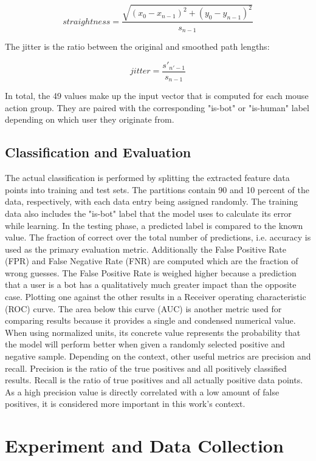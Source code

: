 \documentclass[
    fontsize=12pt,
    headings=small,
    parskip=half,           %
    bibliography=totoc,
    numbers=noenddot,       %
    open=any,               %
    final,                   %
    table
]{scrreprt}
\begin{document}
\[
straightness = \frac{ \sqrt{ (x_0 - x_{n-1})^2 + (y_0 - y_{n-1})^2 } }{s_{n-1}}
\]

The jitter is the ratio between the original and smoothed path lengths:

\[
jitter = \frac{s'_{n'-1}}{s_{n-1}}
\]

In total, the 49 values make up the input vector that is computed for each mouse action group. They are paired with the corresponding "is-bot" or "is-human" label depending on which user they originate from.


\subsection{Classification and Evaluation}

The actual classification is performed by splitting the extracted feature data points into training and test sets. The partitions contain 90 and 10 percent of the data, respectively, with each data entry being assigned randomly. The training data also includes the "is-bot" label that the model uses to calculate its error while learning. In the testing phase, a predicted label is compared to the known value. The fraction of correct over the total number of predictions, i.e. accuracy is used as the primary evaluation metric. Additionally the False Positive Rate (FPR) and False Negative Rate (FNR) are computed which are the fraction of wrong guesses. The False Positive Rate is weighed higher because a prediction that a user is a bot has a qualitatively much greater impact than the opposite case. Plotting one against the other results in a Receiver operating characteristic (ROC) curve. The area below this curve (AUC) is another metric used for comparing results because it provides a single and condensed numerical value. When using normalized units, its concrete value represents the probability that the model will perform better when given a randomly selected positive and negative sample.\cite{FAWCETT2006861} Depending on the context, other useful metrics are precision and recall. Precision is the ratio of the true positives and all positively classified results. Recall is the ratio of true positives and all actually positive data points. As a high precision value is directly correlated with a low amount of false positives, it is considered more important in this work's context.

\section{Experiment and Data Collection}
\end{document}
